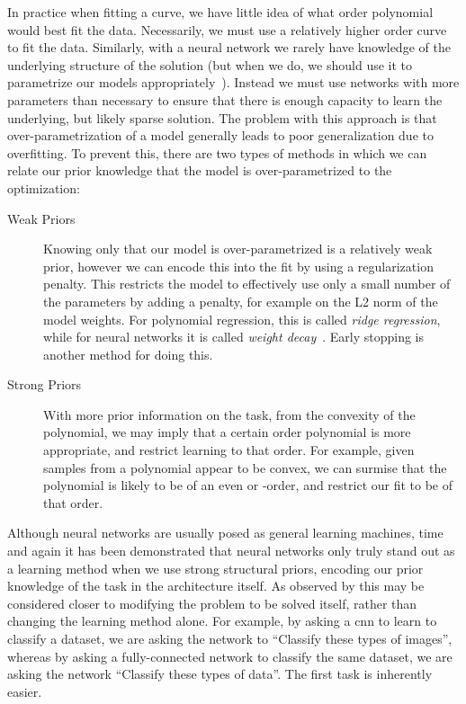 \documentclass[thesis]{subfiles}
\begin{document}
	In practice when fitting a curve, we have little idea of what order polynomial would best fit the data. Necessarily, we must use a relatively higher order curve to fit the data. Similarly, with a neural network we rarely have knowledge of the underlying structure of the solution (but when we do, we should use it to parametrize our models appropriately~\citep{jain2016structural}). Instead we must use networks with more parameters than necessary to ensure that there is enough capacity to learn the underlying, but likely sparse solution. The problem with this approach is that over-parametrization of a model generally leads to poor generalization due to overfitting. To prevent this, there are two types of methods in which we can relate our prior knowledge that the model is over-parametrized to the optimization:
	\begin{description}
	\item[Weak Priors]
	Knowing only that our model is over-parametrized is a relatively weak prior, however we can encode this into the fit by using a regularization penalty. This restricts the model to effectively use only a small number of the parameters by adding a penalty, for example on the L2 norm of the model weights. For polynomial regression, this is called \emph{ridge regression}, while for neural networks it is called \emph{weight decay}~\citep{hinton1987learning}. Early stopping is another method for doing this.
	
	\item[Strong Priors]
	With more prior information on the task, \eg from the convexity of the polynomial, we may imply that a certain order polynomial is more appropriate, and restrict learning to that order. For example, given samples from a polynomial appear to be convex, we can surmise that the polynomial is likely to be of an even or -order, and restrict our fit to be of that order. 
    \end{description}
    
	Although neural networks are usually posed as general learning machines, time and again it has been demonstrated that neural networks only truly stand out as a learning method when we use strong structural priors, encoding our prior knowledge of the task in the architecture itself. As observed by \citet{denker1987large} this may be considered closer to modifying the problem to be solved itself, rather than changing the learning method alone. For example, by asking a \gls{cnn} to learn to classify a dataset, we are asking the network to ``Classify these types of images'', whereas by asking a fully-connected network to classify the same dataset, we are asking the network ``Classify these types of data''. The first task is inherently easier.
\end{document}
